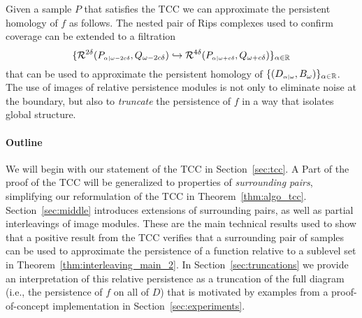 Given a sample $P$ that satisfies the TCC we can approximate the persistent homology of $f$ as follows.
The nested pair of Rips complexes used to confirm coverage can be extended to a filtration
\[ \{\mathcal{R}^{2\delta}(P_{\scriptscriptstyle \alpha\mid \omega-2c\delta}, Q_{\omega-2c\delta})\hookrightarrow \mathcal{R}^{4\delta}(P_{\scriptscriptstyle \alpha\mid \omega+c\delta}, Q_{\omega+c\delta})\}_{\alpha\in\mathbb{R}}\]
that can be used to approximate the persistent homology of $\{(D_{\scriptscriptstyle \alpha\mid \omega}, B_\omega)\}_{\alpha\in\mathbb{R}}$.
The use of images of relative persistence modules is not only to eliminate noise at the boundary, but also to \emph{truncate} the persistence of $f$ in a way that isolates global structure.

\paragraph*{Outline}

We will begin with our statement of the TCC in Section~\ref{sec:tcc}.
A Part of the proof of the TCC will be generalized to properties of \emph{surrounding pairs}, simplifying our reformulation of the TCC in Theorem~\ref{thm:algo_tcc}.
Section~\ref{sec:middle} introduces extensions of surrounding pairs, as well as partial interleavings of image modules.
These are the main technical results used to show that a positive result from the TCC verifies that a surrounding pair of samples can be used to approximate the persistence of a function relative to a sublevel set in Theorem~\ref{thm:interleaving_main_2}.
In Section~\ref{sec:truncations} we provide an interpretation of this relative persistence as a truncation of the full diagram (i.e., the persistence of $f$ on all of $D$) that is motivated by examples from a proof-of-concept implementation in Section~\ref{sec:experiments}.

